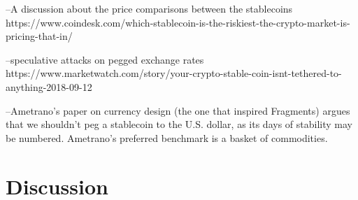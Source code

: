 --A discussion about the price comparisons between the stablecoins  https://www.coindesk.com/which-stablecoin-is-the-riskiest-the-crypto-market-is-pricing-that-in/

--speculative attacks on pegged exchange rates https://www.marketwatch.com/story/your-crypto-stable-coin-isnt-tethered-to-anything-2018-09-12

--Ametrano's paper on currency design (the one that inspired Fragments) argues that we shouldn't peg a stablecoin to the U.S. dollar, as its days of stability may be numbered. Ametrano's preferred benchmark is a basket of commodities. ~\cite{cryptoinsider}

\section{Discussion}

